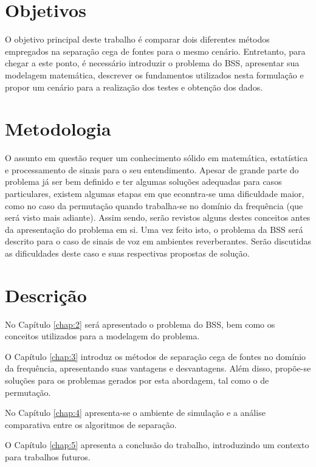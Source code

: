 \section{Objetivos}

O objetivo principal deste trabalho é comparar dois diferentes métodos empregados na separação cega de fontes para o mesmo cenário. Entretanto, para chegar a este ponto, é necessário introduzir o problema do BSS, apresentar sua modelagem matemática, descrever os fundamentos utilizados nesta formulação e propor um cenário para a realização dos testes e obtenção dos dados.


\section{Metodologia}

O assunto em questão requer um conhecimento sólido em matemática, estatística e processamento de sinais para o seu entendimento. Apesar de grande parte do problema já ser bem definido e ter algumas soluções adequadas para casos particulares, existem algumas etapas em que econntra-se uma dificuldade maior, como no caso da permutação quando trabalha-se no domínio da frequência (que será visto mais adiante). Assim sendo, serão revistos alguns destes conceitos antes da apresentação do problema em si. Uma vez feito isto, o problema da BSS será descrito para o caso de sinais de voz em ambientes reverberantes. Serão discutidas as dificuldades deste caso e suas respectivas propostas de solução.


\section{Descrição}

No Capítulo \ref{chap:2} será apresentado o problema do BSS, bem como os conceitos utilizados para a modelagem do problema.

O Capítulo \ref{chap:3} introduz os métodos de separação cega de fontes no domínio da frequência, apresentando suas vantagens e desvantagens. Além disso, propõe-se soluções para os problemas gerados por esta abordagem, tal como o de permutação.

No Capítulo \ref{chap:4} apresenta-se o ambiente de simulação e a análise comparativa entre os algoritmos de separação.

O Capítulo \ref{chap:5} apresenta a conclusão do trabalho, introduzindo um contexto para trabalhos futuros.

